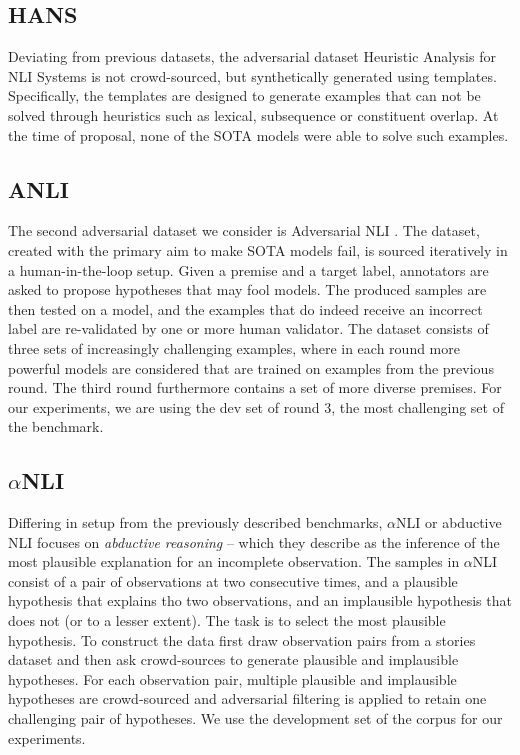 \subsection{HANS}
Deviating from previous datasets, the adversarial dataset Heuristic Analysis for NLI Systems \citep[HANS,][]{mccoy-etal-2019-right} is not crowd-sourced, but synthetically generated using templates.
Specifically, the templates are designed to generate examples that can not be solved through heuristics such as lexical, subsequence or constituent overlap.
At the time of proposal, none of the SOTA models were able to solve such examples.

\subsection{ANLI}
The second adversarial dataset we consider is Adversarial NLI \citep[or ANLI,][]{nie-etal-2020-adversarial}.
The dataset, created with the primary aim to make SOTA models fail, is sourced iteratively in a human-in-the-loop setup.
Given a premise and a target label, annotators are asked to propose hypotheses that may fool models.
The produced samples are then tested on a model, and the examples that do indeed receive an incorrect label are re-validated by one or more human validator.
The dataset consists of three sets of increasingly challenging examples, where in each round more powerful models are considered that are trained on examples from the previous round.
The third round furthermore contains a set of more diverse premises.
For our experiments, we are using the dev set of round 3, the most challenging set of the benchmark.

\subsection{$\alpha$NLI}
Differing in setup from the previously described benchmarks, $\alpha$NLI or abductive NLI \citep{bhagavatula2020abductive} focuses on \emph{abductive reasoning} -- which they describe as the inference of the most plausible explanation for an incomplete observation.
The samples in $\alpha$NLI consist of a pair of observations at two consecutive times, and a plausible hypothesis that explains tho two observations, and an implausible hypothesis that does not (or to a lesser extent).
The task is to select the most plausible hypothesis.
To construct the data \citet{bhagavatula2020abductive} first draw observation pairs from a stories dataset and then ask crowd-sources to generate plausible and implausible hypotheses. 
For each observation pair, multiple plausible and implausible hypotheses are crowd-sourced and adversarial filtering is applied to retain one challenging pair of hypotheses.
We use the development set of the corpus for our experiments.

